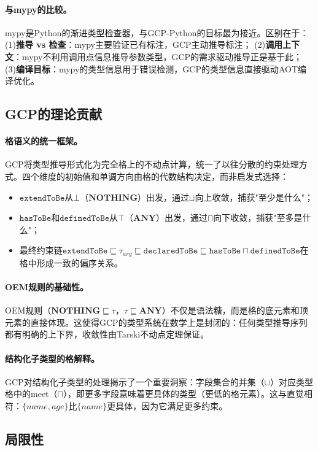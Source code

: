 \documentclass[UTF8]{article}
\newcommand{\NOTHING}{\mathbf{NOTHING}}
\newcommand{\ANY}{\mathbf{ANY}}
\newcommand{\extendToBe}{\texttt{extendToBe}}
\newcommand{\declaredToBe}{\texttt{declaredToBe}}
\newcommand{\hasToBe}{\texttt{hasToBe}}
\newcommand{\definedToBe}{\texttt{definedToBe}}
\begin{document}
\paragraph{与mypy的比较。}
mypy是Python的渐进类型检查器，与GCP-Python的目标最为接近。区别在于：
(1)\textbf{推导 vs 检查}：mypy主要验证已有标注，GCP主动推导标注；
(2)\textbf{调用上下文}：mypy不利用调用点信息推导参数类型，GCP的需求驱动推导正是基于此；
(3)\textbf{编译目标}：mypy的类型信息用于错误检测，GCP的类型信息直接驱动AOT编译优化。

\subsection{GCP的理论贡献}

\paragraph{格语义的统一框架。}
GCP将类型推导形式化为完全格上的不动点计算，统一了以往分散的约束处理方式。四个维度的初始值和单调方向由格的代数结构决定，而非启发式选择：
\begin{itemize}
  \item $\extendToBe$从$\bot$（$\NOTHING$）出发，通过$\sqcup$向上收敛，捕获"至少是什么"；
  \item $\hasToBe$和$\definedToBe$从$\top$（$\ANY$）出发，通过$\sqcap$向下收敛，捕获"至多是什么"；
  \item 最终约束链$\extendToBe \sqsubseteq \tau_{arg} \sqsubseteq \declaredToBe \sqsubseteq \hasToBe \sqcap \definedToBe$在格中形成一致的偏序关系。
\end{itemize}

\paragraph{OEM规则的基础性。}
OEM规则（$\NOTHING \sqsubseteq \tau$，$\tau \sqsubseteq \ANY$）不仅是语法糖，而是格的底元素和顶元素的直接体现。这使得GCP的类型系统在数学上是封闭的：任何类型推导序列都有明确的上下界，收敛性由Tarski不动点定理保证。

\paragraph{结构化子类型的格解释。}
GCP对结构化子类型的处理揭示了一个重要洞察：字段集合的并集（$\cup$）对应类型格中的meet（$\sqcap$），即更多字段意味着更具体的类型（更低的格元素）。这与直觉相符：$\{name, age\}$比$\{name\}$更具体，因为它满足更多约束。

\subsection{局限性}
\end{document}
